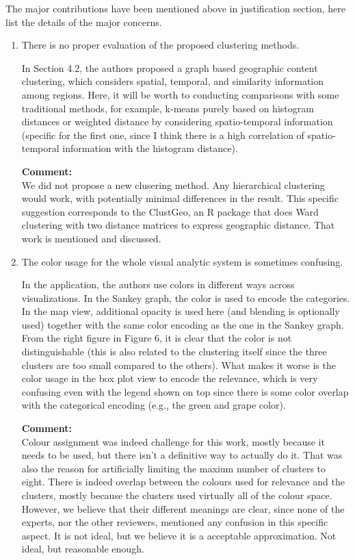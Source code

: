 \documentclass{article}
\newcommand{\reply}[1]{\begin{tcolorbox}\noindent\textbf{Comment:}\\#1\hfill\end{tcolorbox}}
\begin{document}
\begin{itemize}
{    The major contributions have been mentioned above in justification section, here
    list the details of the major concerns.
    \begin{enumerate}

    \item{There is no proper evaluation of the proposed clustering methods. 

    In Section 4.2, the authors proposed a graph based geographic content clustering,
    which considers spatial, temporal, and similarity information among regions. Here,
    it will be worth to conducting comparisons with some traditional methods, for
    example, k-means purely based on histogram distances or weighted distance by
    considering spatio-temporal information (specific for the first one, since I think
    there is a high correlation of spatio-temporal information with the histogram
    distance).

    \reply{We did not propose a new clusering method. Any hierarchical
    clustering would work, with potentially minimal differences in the result.
    This specific suggestion corresponds to the ClustGeo, an R package that does
    Ward clustering with two distance matrices to express geographic distance.
    That work is mentioned and discussed.}}


    \item{The color usage for the whole visual analytic system is sometimes confusing. 

    In the application, the authors use colors in different ways across
    visualizations. In the Sankey graph, the color is used to encode the categories.
    In the map view, additional opacity is used here (and blending is optionally used)
    together with the same color encoding as the one in the Sankey graph. From the
    right figure in Figure 6, it is clear that the color is not distinguishable (this
    is also related to the clustering itself since the three clusters are too small
    compared to the others). What makes it worse is the color usage in the box plot
    view to encode the relevance, which is very confusing even with the legend shown
    on top since there is some color overlap with the categorical encoding (e.g., the
    green and grape color).

    \reply{Colour assignment was indeed challenge for this work, mostly because
    it needs to be used, but there isn't a definitive way to actually do it.
    That was also the reason for artificially limiting the maxium number of
    clusters to eight. There is indeed overlap between the colours used for
    relevance and the clusters, mostly because the clusters used virtually all
    of the colour space. However, we believe that their different meanings are
    clear, since none of the experts, nor the other reviewers, mentioned any
    confusion in this specific aspect. It is not ideal, but we believe it is a
    acceptable approximation. Not ideal, but reasonable enough.}}


\end{enumerate}}
\end{itemize}
\end{document}

